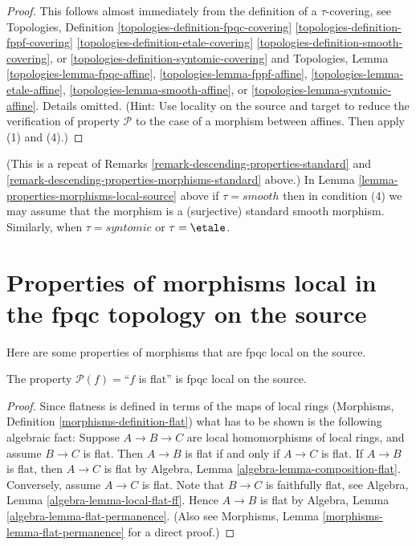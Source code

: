 \begin{proof}
This follows almost immediately from the definition of
a $\tau$-covering, see
Topologies, Definition
\ref{topologies-definition-fpqc-covering}
\ref{topologies-definition-fppf-covering}
\ref{topologies-definition-etale-covering}
\ref{topologies-definition-smooth-covering}, or
\ref{topologies-definition-syntomic-covering}
and Topologies, Lemma
\ref{topologies-lemma-fpqc-affine},
\ref{topologies-lemma-fppf-affine},
\ref{topologies-lemma-etale-affine},
\ref{topologies-lemma-smooth-affine}, or
\ref{topologies-lemma-syntomic-affine}.
Details omitted. (Hint: Use locality on the source and target to
reduce the verification of property $\mathcal{P}$ to the case of
a morphism between affines. Then apply (1) and (4).)
\end{proof}

\begin{remark}
\label{remark-properties-morphisms-local-source-standard}
(This is a repeat of
Remarks \ref{remark-descending-properties-standard}
and \ref{remark-descending-properties-morphisms-standard} above.)
In Lemma \ref{lemma-properties-morphisms-local-source} above if
$\tau = smooth$ then in condition (4) we may assume that
the morphism is a (surjective) standard smooth morphism.
Similarly, when $\tau = syntomic$ or $\tau = \etale$.
\end{remark}



\section{Properties of morphisms local in the fpqc topology on the source}
\label{section-fpqc-local-source}

\noindent
Here are some properties of morphisms that are fpqc local on the source.

\begin{lemma}
\label{lemma-flat-fpqc-local-source}
The property $\mathcal{P}(f)=$``$f$ is flat'' is fpqc local on the source.
\end{lemma}

\begin{proof}
Since flatness is defined in terms of the maps of local rings
(Morphisms, Definition \ref{morphisms-definition-flat})
what has to be shown is the following
algebraic fact: Suppose $A \to B \to C$ are local homomorphisms of local
rings, and assume $B \to C$ is flat. Then $A \to B$ is
flat if and only if $A \to C$ is flat.
If $A \to B$ is flat, then $A \to C$ is flat by
Algebra, Lemma \ref{algebra-lemma-composition-flat}.
Conversely, assume $A \to C$ is flat.
Note that $B \to C$ is faithfully
flat, see
Algebra, Lemma \ref{algebra-lemma-local-flat-ff}.
Hence $A \to B$ is flat by
Algebra, Lemma \ref{algebra-lemma-flat-permanence}.
(Also see Morphisms, Lemma \ref{morphisms-lemma-flat-permanence}
for a direct proof.)
\end{proof}

